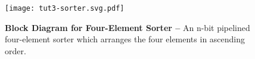 
\begin{figure}
  \centering

  \texttt{[image: tut3-sorter.svg.pdf]}

  \caption{\textbf{Block Diagram for Four-Element Sorter --} An n-bit
    pipelined four-element sorter which arranges the four elements in
    ascending order.}
  \label{fig-tut3-sorter}

\end{figure}

